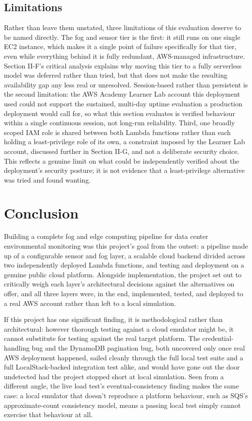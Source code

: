 \documentclass[conference]{IEEEtran}
\begin{document}
\subsection{Limitations}
Rather than leave them unstated, three limitations of this evaluation deserve to be named directly. The fog and sensor tier is the first: it still runs on one single EC2 instance, which makes it a single point of failure specifically for that tier, even while everything behind it is fully redundant, AWS-managed infrastructure. Section II-F's critical analysis explains why moving this tier to a fully serverless model was deferred rather than tried, but that does not make the resulting availability gap any less real or unresolved. Session-based rather than persistent is the second limitation: the AWS Academy Learner Lab account this deployment used could not support the sustained, multi-day uptime evaluation a production deployment would call for, so what this section evaluates is verified behaviour within a single continuous session, not long-run reliability. Third, one broadly scoped IAM role is shared between both Lambda functions rather than each holding a least-privilege role of its own, a constraint imposed by the Learner Lab account, discussed further in Section II-G, and not a deliberate security choice. This reflects a genuine limit on what could be independently verified about the deployment's security posture; it is not evidence that a least-privilege alternative was tried and found wanting.

\section{Conclusion}
Building a complete fog and edge computing pipeline for data center environmental monitoring was this project's goal from the outset: a pipeline made up of a configurable sensor and fog layer, a scalable cloud backend divided across two independently deployed Lambda functions, and testing and deployment on a genuine public cloud platform. Alongside implementation, the project set out to critically weigh each layer's architectural decisions against the alternatives on offer, and all three layers were, in the end, implemented, tested, and deployed to a real AWS account rather than left to a local simulation.

If this project has one significant finding, it is methodological rather than architectural: however thorough testing against a cloud emulator might be, it cannot substitute for testing against the real target platform. The credential-handling bug and the DynamoDB pagination bug, both uncovered only once real AWS deployment happened, sailed cleanly through the full local test suite and a full LocalStack-backed integration test alike, and would have gone out the door undetected had the project stopped short at local simulation. Seen from a different angle, the live load test's eventual-consistency finding makes the same case: a local emulator that doesn't reproduce a platform behaviour, such as SQS's approximate-count consistency model, means a passing local test simply cannot exercise that behaviour at all.
\end{document}
